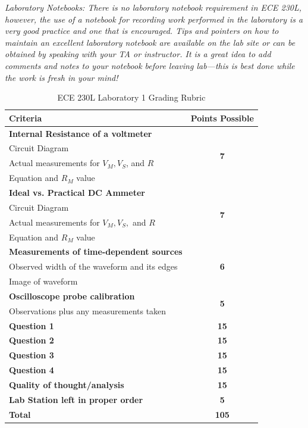 \documentclass[12pt]{../manual}
\begin{document}
 \textit{Laboratory Notebooks:  There is no laboratory notebook requirement in ECE 230L, however, the use of a notebook for recording work performed in the laboratory is a very good practice and one that is encouraged.  Tips and pointers on how to maintain an excellent laboratory notebook are available on the lab site or can be obtained by speaking with your TA or instructor. It is a great idea to add comments and notes to your notebook before leaving lab---this is best done while the work is fresh in your mind!}
%
\newpage
{}
{}
\hspace{0pt}
\vfill
\begin{table}[ht!]
\caption{ECE 230L Laboratory 1 Grading Rubric}
\centering
\begin{tabular}{l|c} \hline
Criteria & Points Possible \\ \hline \hline
\textbf{Internal Resistance of a voltmeter}					& \multirow{4}{*}{\textbf{7}} \\
Circuit Diagram												& \\
Actual measurements for $V_M, V_S$, and $R$					& \\
Equation and $R_M$ value									& \\ \hline
\textbf{Ideal vs. Practical DC Ammeter}						& \multirow{4}{*}{\textbf{7}} \\
Circuit Diagram												& \\
Actual measurements for $V_M, V_S,$ and $R$					& \\
Equation and $R_M$ value									& \\ \hline
\textbf{Measurements of time-dependent sources}				& \multirow{3}{*}{\textbf{6}} \\
Observed width of the waveform and its edges				& \\ 
Image of waveform 											& \\ \hline
\textbf{Oscilloscope probe calibration}						& \multirow{2}{*}{\textbf{5}} \\ 
Observations plus any measurements taken					& \\ \hline
\textbf{Question 1}											& \textbf{15} \\ \hline
\textbf{Question 2}											& \textbf{15} \\ \hline
\textbf{Question 3}											& \textbf{15} \\ \hline
\textbf{Question 4}											& \textbf{15} \\ \hline
\textbf{Quality of thought/analysis}						& \textbf{15} \\ \hline
\textbf{Lab Station left in proper order}					& \textbf{5} \\ \hline \hline
\textbf{Total}												& \textbf{105} \\ \hline
\end{tabular}
\end{table}
\vfill
\hspace{0pt}
%
\end{document}
